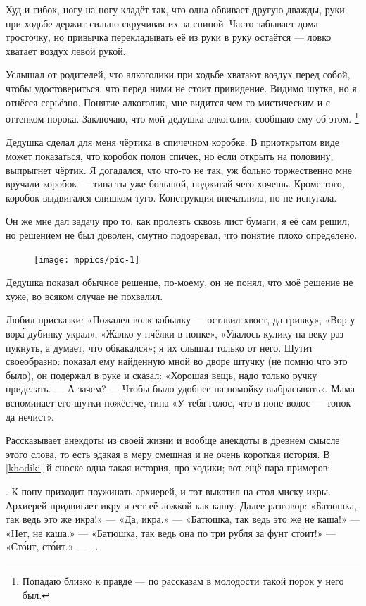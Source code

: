 \documentclass{book}
\begin{document}
Худ и гибок, ногу на ногу кладёт так, что одна обвивает другую дважды,
руки при ходьбе держит сильно скручивая их за спиной.
Часто забывает дома тросточку, но привычка перекладывать её из руки в руку остаётся --- ловко хватает воздух левой рукой.

Услышал от родителей, что алкоголики при ходьбе хватают воздух перед собой, чтобы удостовериться,
что перед ними не стоит привидение.
Видимо шутка, но я отнёсся серьёзно.
Понятие алкоголик, мне видится чем-то мистическим и с оттенком порока.
Заключаю, что мой дедушка алкоголик, сообщаю ему об этом.%
\footnote{Попадаю близко к правде --- по рассказам в молодости такой порок у него был.}

Дедушка сделал для меня чёртика в спичечном коробке.
В приоткрытом виде может показаться, что коробок полон спичек,
но если открыть на половину, выпрыгнет чёртик.
Я  догадался, что что-то не так, уж больно торжественно мне вручали коробок --- типа ты уже большой, поджигай чего хочешь.
Кроме того, коробок выдвигался слишком туго.
Конструкция впечатлила, но не испугала.

Он же мне дал задачу про то, как пролезть сквозь лист бумаги;
я её сам решил, но решением не был доволен, смутно подозревал, что понятие  плохо определено.
\begin{figure}[ht!]
\vskip-0mm
\centering
\texttt{[image: mppics/pic-1]}
\end{figure}
Дедушка показал обычное решение, по-моему, он не понял, что моё решение не хуже, во всяком случае не похвалил.

Любил присказки: «Пожалел волк кобылку --- оставил хвост, да гривку», «Вор у вор\'{а} дубинку украл», «Жалко у пчёлки в попке», «Удалось кулику на веку раз пукнуть, а думает, что обкакался»; я их слышал только от него.
Шутит своеобразно: показал ему найденную мной во дворе штучку (не помню что это было), он подержал в руке и сказал: «Хорошая вещь, надо только ручку приделать.
--- А зачем? --- Чтобы было удобнее на помойку выбрасывать».
Мама вспоминает его шутки пожёстче, типа «У тебя голос, что в попе волос --- тонок да нечист».

Рассказывает анекдоты из своей жизни и вообще анекдоты в древнем смысле этого слова, то есть эдакая в меру смешная и не очень короткая история.
В \ref{khodiki}-й сноске одна такая история, про ходики; вот ещё пара примеров:

.
К попу приходит поужинать архиерей, и тот выкатил на стол миску икры.
Архиерей придвигает икру и ест её ложкой как кашу.
Далее разговор: 
«Батюшка, так ведь это же икра!»
--- «Да, икра.»
--- «Батюшка, так ведь это же не каша!»
--- «Нет, не каша.»
--- «Батюшка, так ведь она по три рубля за фунт ст\'{о}ит!»
--- «Ст\'{о}ит, ст\'{о}ит.» --- ...
\end{document}
